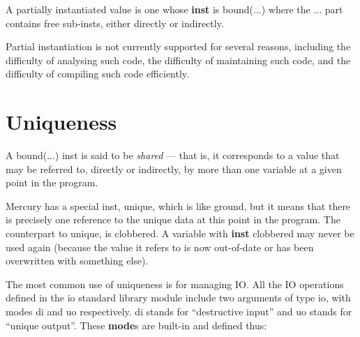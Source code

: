 \documentclass[a4paper,11pt,notitlepage,onecolumn]{book}
\begin{document}
A partially instantiated value is one whose \textsf{\textbf{inst}} is \textsf{bound(...)} where
the \textsf{...} part contains \textsf{free} sub-insts, either directly or indirectly.

Partial instantiation is not currently supported for several reasons,
including the difficulty of analysing such code, the difficulty of
maintaining such code, and the difficulty of compiling such code
efficiently.

\section{Uniqueness}

A \textsf{bound(...)} inst is said to be \emph{shared} --- that is, it corresponds
to a value that may be referred to, directly or indirectly, by more than one
variable at a given point in the program.

Mercury has a special inst, \textsf{unique}, which is like \textsf{ground}, but it means
that there is precisely one reference to the \textsf{unique} data at this point in
the program.  The counterpart to \textsf{unique}, is \textsf{clobbered}.  A variable with
\textsf{\textbf{inst}} \textsf{clobbered} may never be used again (\eg because the value it refers
to is now out-of-date or has been overwritten with something else).

The most common use of uniqueness is for managing IO.  All the IO operations
defined in the \textsf{io} standard library module include two arguments of type
\textsf{io}, with modes \textsf{di} and \textsf{uo} respectively.  \textsf{di} stands for ``destructive
input'' and \textsf{uo} stands for ``unique output''.  These \textsf{\textbf{mode}}s are built-in
and defined thus:

\begin{small}

\begin{ptabular}
\nextline
{}
\nextline
\end{ptabular}

\end{small}
\end{document}
